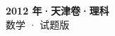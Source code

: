 \documentclass[zihao=-4, a4paper]{ctexart}
\begin{document}
\begin{center}
  {\Large\bfseries 2012 年·天津卷·理科}\\[4pt]
  {\large 数学 · 试题版}
\end{center}
\medskip
{}

\end{document}

